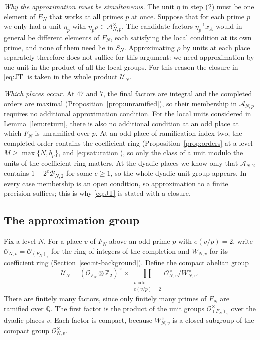 \documentclass[11pt]{article}
\theoremstyle{plain}
\theoremstyle{definition}
\theoremstyle{remark}
\newcommand{\Z}{\mathbb Z}
\newcommand{\Q}{\mathbb Q}
\newcommand{\OO}{\mathcal O}
\begin{document}
\emph{Why the approximation must be simultaneous.}  The unit $\eta$ in
step (2) must be one element of $E_N$ that works at all primes $p$ at once.
Suppose that for each prime $p$ we only had a unit $\eta_p$ with
$\eta_p\rho\in\mathcal A_{N,p}^\times$.  The candidate factors
$\eta_p^{-1}x_A$ would in general be different elements of $F_N$, each
satisfying the local condition at its own prime, and none of them need lie
in $S_N$.  Approximating $\rho$ by units at each place separately
therefore does not suffice for this argument: we need approximation by one
unit in the product of all the local groups.  For this reason the closure
in \eqref{eq:JT} is taken in the whole product $\mathcal U_N$.

\emph{Which places occur.}  At $47$ and $7$, the final factors are
integral and the completed orders are maximal
(Proposition~\ref{prop:unramified}), so their membership in
$\mathcal A_{N,p}$ requires no additional approximation condition.
For the local units considered in Lemma~\ref{lem:return}, there is also
no additional condition at an odd place at which $F_N$ is unramified
over $p$.  At an odd place of ramification index two, the completed order
contains the coefficient ring (Proposition~\ref{prop:orders} at a level
$M\ge\max\{N,b_p\}$, and \eqref{eq:saturation}), so only the
class of a unit modulo the units of the coefficient ring matters.  At the
dyadic places we know only that $\mathcal A_{N,2}$ contains
$1+2^e\mathcal B_{N,2}$ for some $e\ge1$, so the whole dyadic unit group
appears.  In every case membership is an open condition, so approximation
to a finite precision suffices; this is why \eqref{eq:JT} is stated with a
closure.

\subsection{The approximation group}\label{sec:joint-group}

Fix a level $N$.  For a place $v$ of $F_N$ above an odd prime $p$ with
$e(v/p)=2$, write $\OO_{N,v}=\OO_{(F_N)_v}$ for the ring of integers
of the completion and $W_{N,v}$ for its coefficient ring
(Section~\ref{sec:nt-background}).  Define the compact abelian group
\begin{equation}\label{eq:TN}
 \mathcal U_N=(\OO_{F_N}\otimes\Z_2)^\times\times
 \prod_{\substack{v\text{ odd}\\e(v/p)=2}}
       \OO_{N,v}^\times/W_{N,v}^\times.
\end{equation}
There are finitely many factors, since only finitely many primes of $F_N$
are ramified over $\Q$.  The first factor is the product of the unit
groups $\OO_{(F_N)_v}^\times$ over the dyadic places $v$.  Each factor is
compact, because $W_{N,v}^\times$ is a closed subgroup of the compact group
$\OO_{N,v}^\times$.
\end{document}
